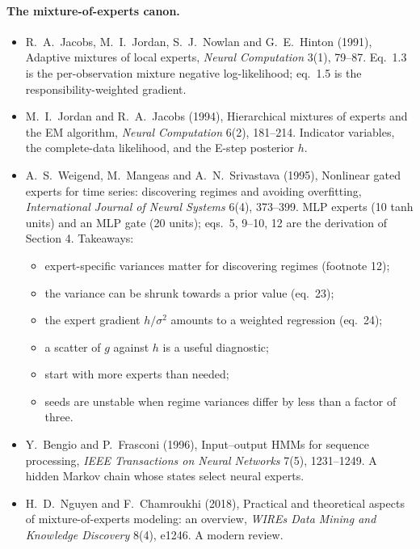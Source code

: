 \paragraph{The mixture-of-experts canon.}
\begin{itemize}
  \item R.~A.~Jacobs, M.~I.~Jordan, S.~J.~Nowlan and G.~E.~Hinton (1991), Adaptive mixtures of local experts, \emph{Neural Computation} 3(1), 79--87. Eq.~1.3 is the per-observation mixture negative log-likelihood; eq.~1.5 is the responsibility-weighted gradient.
  \item M.~I.~Jordan and R.~A.~Jacobs (1994), Hierarchical mixtures of experts and the EM algorithm, \emph{Neural Computation} 6(2), 181--214. Indicator variables, the complete-data likelihood, and the E-step posterior $h$.
  \item A.~S.~Weigend, M.~Mangeas and A.~N.~Srivastava (1995), Nonlinear gated experts for time series: discovering regimes and avoiding overfitting, \emph{International Journal of Neural Systems} 6(4), 373--399. MLP experts (10 tanh units) and an MLP gate (20 units); eqs.~5, 9--10, 12 are the derivation of Section 4. Takeaways:
  \begin{itemize}
    \item expert-specific variances matter for discovering regimes (footnote 12);
    \item the variance can be shrunk towards a prior value (eq.~23);
    \item the expert gradient $h/\sigma^2$ amounts to a weighted regression (eq.~24);
    \item a scatter of $g$ against $h$ is a useful diagnostic;
    \item start with more experts than needed;
    \item seeds are unstable when regime variances differ by less than a factor of three.
  \end{itemize}
  \item Y.~Bengio and P.~Frasconi (1996), Input--output HMMs for sequence processing, \emph{IEEE Transactions on Neural Networks} 7(5), 1231--1249. A hidden Markov chain whose states select neural experts.
  \item H.~D.~Nguyen and F.~Chamroukhi (2018), Practical and theoretical aspects of mixture-of-experts modeling: an overview, \emph{WIREs Data Mining and Knowledge Discovery} 8(4), e1246. A modern review.
\end{itemize}

